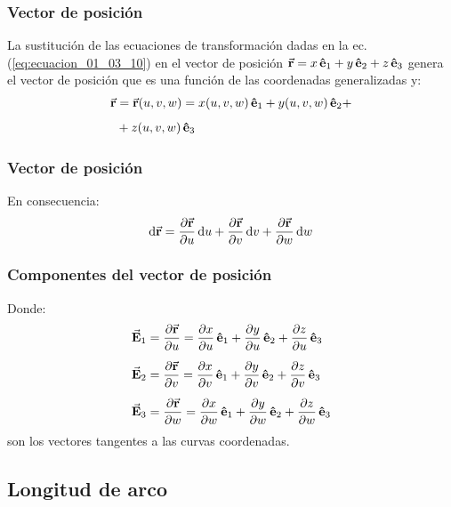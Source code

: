 \documentclass[12pt]{beamer}
\begin{document}
\begin{frame}
\frametitle{Vector de posición}
La sustitución de las ecuaciones de transformación dadas en la ec. (\ref{eq:ecuacion_01_03_10}) en el vector de posición $\va{r} = x\, \vu{e}_{1} + y\, \vu{e}_{2} + z\, \vu{e}_{3}$ genera el vector de posición que es una función de las coordenadas generalizadas y:
\pause
\begin{align*}
\va{r} &= \va{r} (u, v, w) = x (u, v, w) \, \vu{e}_{1} + y (u, v, w) \, \vu{e}_{2} + \\[0.5em]
&+ z (u, v, w) \, \vu{e}_{3}
\end{align*}
\end{frame}
\begin{frame}
\frametitle{Vector de posición}
En consecuencia:
\pause
\begin{align*}
\dd{\va{r}} = \pdv{\va{r}}{u} \dd{u} + \pdv{\va{r}}{v} \dd{v} + \pdv{\va{r}}{w} \dd{w}
\end{align*}
\end{frame}
\begin{frame}
\frametitle{Componentes del vector de posición}
Donde:
\pause
\begin{align}
\begin{aligned}
\va{E}_{1} &= \pdv{\va{r}}{u} = \pdv{x}{u} \, \vu{e}_{1} + \pdv{y}{u} \, \vu{e}_{2} + \pdv{z}{u} \, \vu{e}_{3} \\[0.5em]
\va{E}_{2} &= \pdv{\va{r}}{v} = \pdv{x}{v} \, \vu{e}_{1} + \pdv{y}{v} \, \vu{e}_{2} + \pdv{z}{v} \, \vu{e}_{3} \\[0.5em]
\va{E}_{3} &= \pdv{\va{r}}{w} = \pdv{x}{w} \, \vu{e}_{1} + \pdv{y}{w} \, \vu{e}_{2} + \pdv{z}{w} \, \vu{e}_{3}
\end{aligned}
\label{eq:ecuacion_01_03_11}
\end{align}
son los vectores tangentes a las curvas coordenadas.
\end{frame}

\subsection{Longitud de arco}
\end{document}
